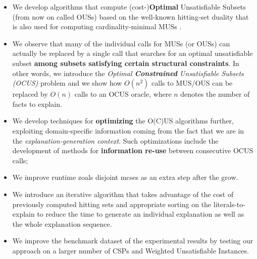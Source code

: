 \documentclass[twoside,11pt]{article}
\begin{document}
\tableofcontents
\begin{itemize}
\item We develop algorithms that compute (cost-)\textbf{Optimal} Unsatisfiable Subsets (from now on called OUSs) based on the well-known hitting-set duality that is also used for computing cardinality-minimal MUSs \cite{ignatiev2015smallest,DBLP:conf/kr/SaikkoWJ16}.
\item We observe that many of the individual calls for MUSs (or OUSs) can actually be replaced by a single call that searches for an optimal unsatisfiable subset \textbf{among subsets satisfying certain structural constraints}. In other words, we introduce the \emph{Optimal \textbf{Constrained} Unsatisfiable Subsets (OCUS)} problem and we show how $O(n^2)$ calls to MUS/OUS can be replaced by $O(n)$ calls to an OCUS oracle, where $n$ denotes the number of facts to explain. 
\item We develop techniques for \textbf{optimizing} the O(C)US algorithms further, exploiting domain-specific information coming from the fact that we are in the \emph{explanation-generation context}. Such optimizations include the development of methods for \textbf{information re-use} between consecutive OCUS calls;
\item We improve runtime zoals disjoint mcses as an extra step after the grow.
\item We introduce an iterative algorithm that takes advantage of the cost of previously computed hitting sets and appropriate sorting on the literals-to-explain to reduce the time to generate an individual explanation as well as the whole explanation sequence.
\item We improve the benchmark dataset of the experimental results by testing our approach on a larger number of CSPs and Weighted Unsatisfiable Instances.
\end{itemize}
\end{document}

